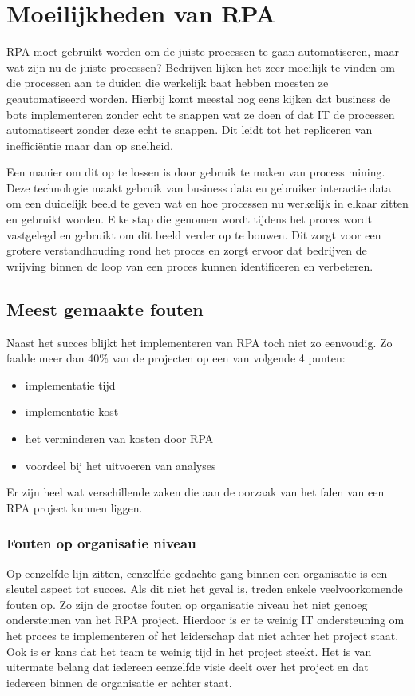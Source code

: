 \section{Moeilijkheden van RPA}
RPA moet gebruikt worden om de juiste processen te gaan automatiseren, maar wat zijn nu de juiste processen? Bedrijven lijken het zeer moeilijk te vinden om die processen aan te duiden die werkelijk baat hebben moesten ze geautomatiseerd worden. Hierbij komt meestal nog eens kijken dat business de bots implementeren zonder echt te snappen wat ze doen of dat IT de processen automatiseert zonder deze echt te snappen. Dit leidt tot het repliceren van inefficiëntie maar dan op snelheid.  \autocite{cFutRPA}

Een manier om dit op te lossen is door gebruik te maken van process mining. Deze technologie maakt gebruik van business data en gebruiker interactie data om een duidelijk beeld te geven wat en hoe processen nu werkelijk in elkaar zitten en gebruikt worden. Elke stap die genomen wordt tijdens het proces wordt vastgelegd en gebruikt om dit beeld verder op te bouwen. Dit zorgt voor een grotere verstandhouding rond het proces en zorgt ervoor dat bedrijven de wrijving binnen de loop van een proces kunnen identificeren en verbeteren. \autocite{cFutRPA}

\subsection{Meest gemaakte fouten}
Naast het succes blijkt het implementeren van RPA toch niet zo eenvoudig. Zo faalde meer dan 40\% van de projecten op een van volgende 4 punten:
\begin{itemize}
	\item implementatie tijd
	\item implementatie kost
	\item het verminderen van kosten door RPA
	\item voordeel bij het uitvoeren van analyses
\end{itemize}

Er zijn heel wat verschillende zaken die aan de oorzaak van het falen van een RPA project kunnen liggen. \autocite{pitfallsRPA}

\subsubsection{Fouten op organisatie niveau}
Op eenzelfde lijn zitten, eenzelfde gedachte gang binnen een organisatie is een sleutel aspect tot succes. Als dit niet het geval is, treden enkele veelvoorkomende fouten op. Zo zijn de grootse fouten op organisatie niveau het niet genoeg ondersteunen van het RPA project. Hierdoor is er te weinig IT ondersteuning om het proces te implementeren of het leiderschap dat niet achter het project staat. Ook is er kans dat het team te weinig tijd in het project steekt. Het is van uitermate belang dat iedereen eenzelfde visie deelt over het project en dat iedereen binnen de organisatie er achter staat. \autocite{pitfallsRPA}

